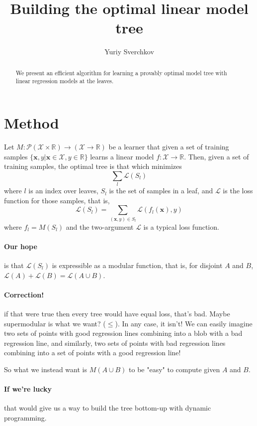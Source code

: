 \documentclass{article}
\title{Building the optimal linear model tree}
\author{Yuriy Sverchkov}
\begin{document}
	\begin{abstract}
		We present an efficient algorithm for learning a provably optimal model tree with linear regression models at the leaves.
	\end{abstract}

\section{Method}

Let $M: \mathcal P( \mathcal X \times \mathbb R ) \rightarrow ( \mathcal X \rightarrow \mathbb R )$ be a learner that given a set of training samples $\{ \mathbf x, y | \mathbf x \in \mathcal X, y \in \mathbb R \}$ learns a linear model $f : \mathcal X \rightarrow \mathbb R$.
Then, given a set of training samples, the optimal tree is that which minimizes
\[ \sum_l \mathcal L( S_l ) \]
where $l$ is an index over leaves, $S_l$ is the set of samples in a leaf, and $\mathcal L$ is the loss function for those samples, that is,
\[ \mathcal L(S_l) = \sum_{ ( \mathbf x, y ) \in S_l } \mathcal L( f_l( \mathbf x ), y ) \]
where $f_l = M( S_l )$ and the two-argument $\mathcal L$ is a typical loss function.

\paragraph{Our hope} is that $\mathcal L( S_l )$ is expressible as a modular function, that is, for disjoint $A$ and $B$, $\mathcal L(A) + \mathcal L(B) = \mathcal L(A \cup B)$.

\paragraph{Correction!} if that were true then every tree would have equal loss, that's bad.
Maybe supermodular is what we want? ($\leq$).
In any case, it isn't! We can easily imagine two sets of points with good regression lines combining into a blob with a bad regression line, and similarly, two sets of points with bad regression lines combining into a set of points with a good regression line!

So what we instead want is $M(A \cup B)$ to be "easy" to compute given $A$ and $B$.

\paragraph{If we're lucky} that would give us a way to build the tree bottom-up with dynamic programming.
\end{document}
